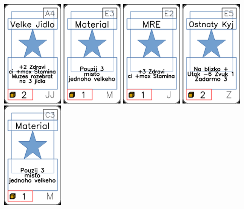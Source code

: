 \documentclass[a4paper]{article}
\begin{document}
	\includegraphics[width=3.0cm]{img-1_33}
	\includegraphics[width=3.0cm]{img-1_52}
	\includegraphics[width=3.0cm]{img-1_21}
	\includegraphics[width=3.0cm]{img-1_84}
	\includegraphics[width=3.0cm]{img-1_42}
\end{document}

